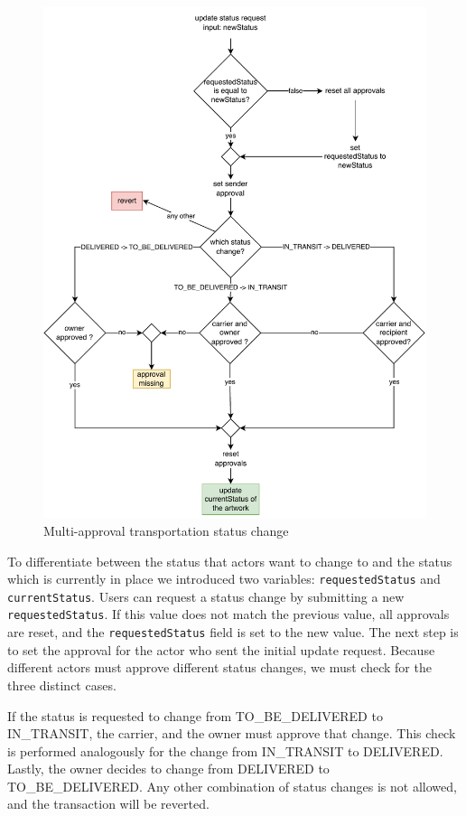 \begin{figure}[ht]
    \centering
    \includegraphics[height=0.62\textheight, keepaspectratio]{diagrams/update_status.drawio.pdf}
    \caption{Multi-approval transportation status change}
    \label{fig:update_status}
\end{figure}

To differentiate between the status that actors want to change to and the status which is currently in place we introduced two variables: \texttt{requestedStatus} and \texttt{currentStatus}. Users can request a status change by submitting a new \texttt{requestedStatus}. If this value does not match the previous value, all approvals are reset, and the \texttt{requestedStatus} field is set to the new value. The next step is to set the approval for the actor who sent the initial update request. Because different actors must approve different status changes, we must check for the three distinct cases.

If the status is requested to change from TO\_BE\_DELIVERED to IN\_TRANSIT, the carrier, and the owner must approve that change. This check is performed analogously for the change from IN\_TRANSIT to DELIVERED. Lastly, the owner decides to change from DELIVERED to TO\_BE\_DELIVERED. Any other combination of status changes is not allowed, and the transaction will be reverted.

